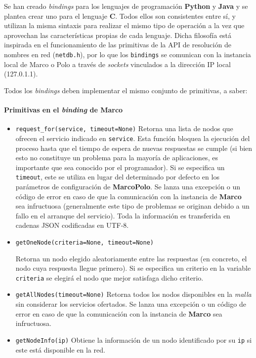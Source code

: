 Se han creado \textit{bindings} para los lenguajes de programación \textbf{Python} y \textbf{Java} y se plantea crear uno para el lenguaje \textbf{C}. Todos ellos son consistentes entre sí, y utilizan la misma sintaxis para realizar el mismo tipo de operación a la vez que aprovechan las características propias de cada lenguaje. Dicha filosofía está inspirada en el funcionamiento de las primitivas de la API de resolución de nombres en red (\texttt{netdb.h})\cite{netdb}, por lo que los \texttt{bindings} se comunican con la instancia local de Marco o Polo a través de \textit{sockets} vinculados a la dirección IP local (127.0.1.1).

Todos los \textit{bindings} deben implementar el mismo conjunto de primitivas, a saber:

\paragraph{Primitivas en el \textit{binding} de Marco}
\begin{itemize}
\item \texttt{request\_for(service, timeout=None)}
Retorna una lista de nodos que ofrecen el servicio indicado en \texttt{service}. Esta función bloquea la ejecución del proceso hasta que el tiempo de espera de nuevas respuestas se cumple (si bien esto no constituye un problema para la mayoría de aplicaciones, es importante que sea conocido por el programador). Si se especifica un \texttt{timeout}, este se utiliza en lugar del determinado por defecto en los parámetros de configuración de \textbf{MarcoPolo}. Se lanza una excepción o un código de error en caso de que la comunicación con la instancia de \textbf{Marco} sea infructuosa (generalmente este tipo de problemas se originan debido a un fallo en el arranque del servicio). Toda la información es transferida en cadenas JSON codificadas en UTF-8.


\item \texttt{getOneNode(criteria=None, timeout=None)}

Retorna un nodo elegido aleatoriamente entre las respuestas (en concreto, el nodo cuya respuesta llegue primero). Si se especifica un criterio en la variable \texttt{criteria} se elegirá el nodo que mejor satisfaga dicho criterio. %

\item \texttt{getAllNodes(timeout=None)}
Retorna todos los nodos disponibles en la \textit{malla} sin considerar los servicios ofertados. Se lanza una excepción o un código de error en caso de que la comunicación con la instancia de \textbf{Marco} sea infructuosa.

\item \texttt{getNodeInfo(ip)} %
Obtiene la información de un nodo identificado por su \texttt{ip} si este está disponible en la red.

\end{itemize}


